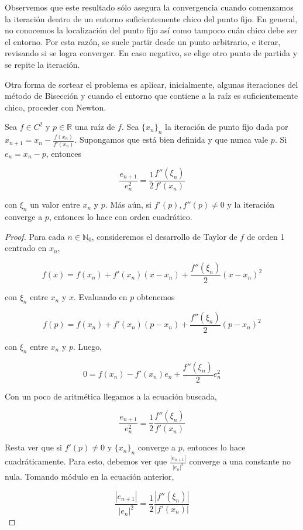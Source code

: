Observemos que este resultado sólo asegura la convergencia cuando comenzamos la iteración dentro de un entorno suficientemente chico del punto fijo. En general, no conocemos la localización del punto fijo así como tampoco cuán chico debe ser el entorno. Por esta razón, se suele partir desde un punto arbitrario, e iterar, revisando si se logra converger. En caso negativo, se elige otro punto de partida y se repite la iteración.

Otra forma de sortear el problema es aplicar, inicialmente, algunas iteraciones del método de Bisección y cuando el entorno que contiene a la raíz es suficientemente chico, proceder con Newton.

\begin{propo}
Sea $f \in C^2$ y $p \in \mathbb{R}$ una raíz de $f$. Sea $\{x_n\}_n$ la iteración de punto fijo dada por $x_{n + 1} = x_n - \frac{f(x_n)}{f'(x_n)}$. Supongamos que está bien definida y que nunca vale $p$. Si $e_n = x_n - p$, entonces

\[\frac{e_{n + 1}}{e_n^2} = \frac{1}{2} \frac{f''(\xi_n)}{f'(x_n)}\]

con $\xi_n$ un valor entre $x_n$ y $p$. Más aún, si $f'(p), f''(p) \neq 0$ y la iteración converge a $p$, entonces lo hace con orden cuadrático.

\begin{proof}

Para cada $n \in \mathbb{N}_0$, consideremos el desarrollo de Taylor de $f$ de orden 1 centrado en $x_n$,

\[f(x) = f(x_n) + f'(x_n) (x - x_n) + \frac{f''(\xi_n)}{2} (x - x_n)^2\]

con $\xi_n$ entre $x_n$ y $x$. Evaluando en $p$ obtenemos

\[f(p) = f(x_n) + f'(x_n) (p - x_n) + \frac{f''(\xi_n)}{2} (p - x_n)^2\]

con $\xi_n$ entre $x_n$ y $p$. Luego,

\[0 = f(x_n) - f'(x_n) e_n + \frac{f''(\xi_n)}{2} e_n^2\]

Con un poco de aritmética llegamos a la ecuación buscada,

\[\frac{e_{n + 1}}{e_n^2} = \frac{1}{2} \frac{f''(\xi_n)}{f'(x_n)}\]

Resta ver que si $f'(p) \neq 0$ y $\{x_n\}_n$ converge a $p$, entonces lo hace cuadráticamente. Para esto, debemos ver que $\frac{|e_{n + 1}|}{|e_n|^2}$ converge a una constante no nula. Tomando módulo en la ecuación anterior,

\[\frac{|e_{n + 1}|}{|e_n|^2} = \frac{1}{2} \frac{|f''(\xi_n)|}{|f'(x_n)|}\]


\end{proof}
\end{propo}
